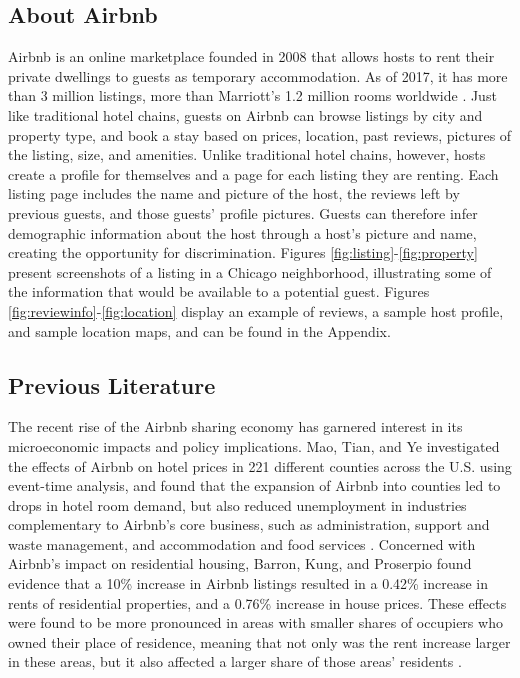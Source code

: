 \subsection{About Airbnb} 
	\label{about}
Airbnb is an online marketplace founded in 2008 that allows hosts to rent their private dwellings to guests as temporary accommodation. As of 2017, it has more than 3 million listings, more than Marriott's 1.2 million rooms worldwide \citep{aboutus}. Just like traditional hotel chains, guests on Airbnb can browse listings by city and property type, and book a stay based on prices, location, past reviews, pictures of the listing, size, and amenities. Unlike traditional hotel chains, however, hosts create a profile for themselves and a page for each listing they are renting. Each listing page includes the name and picture of the host, the reviews left by previous guests, and those guests' profile pictures. Guests can therefore infer demographic information about the host through a host's picture and name, creating the opportunity for discrimination. Figures \ref{fig:listing}-\ref{fig:property} present screenshots of a listing in a Chicago neighborhood, illustrating some of the information that would be available to a potential guest. Figures \ref{fig:reviewinfo}-\ref{fig:location} display an example of reviews, a sample host profile, and sample location maps, and can be found in the Appendix.


\subsection{Previous Literature} 
	\label{previous}
The recent rise of the Airbnb sharing economy has garnered interest in its microeconomic impacts and policy implications. Mao, Tian, and Ye investigated the effects of Airbnb on hotel prices in 221 different counties across the U.S. using event-time analysis, and found that the expansion of Airbnb into counties led to drops in hotel room demand, but also reduced unemployment in industries complementary to Airbnb’s core business, such as administration, support and waste management, and accommodation and food services \citep{mao}. Concerned with Airbnb’s impact on residential housing, Barron, Kung, and Proserpio found evidence that a 10\% increase in Airbnb listings resulted in a 0.42\% increase in rents of residential properties, and a 0.76\% increase in house prices. These effects were found to be more pronounced in areas with smaller shares of occupiers who owned their place of residence, meaning that not only was the rent increase larger in these areas, but it also affected a larger share of those areas’ residents \citep{barron}.

